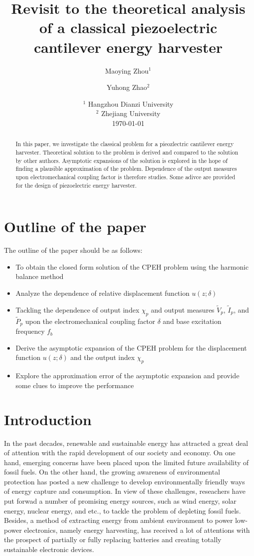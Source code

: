 \documentclass{article}
\title{Revisit to the theoretical analysis of a classical piezoelectric cantilever energy harvester}
\author{Maoying Zhou$^1$ \and Yuhong Zhao$^2$}
\date{%
    $^1$ Hangzhou Dianzi University\\%
    $^2$ Zhejiang University\\[2ex]%
    \today
}
\begin{document}
\maketitle


\begin{abstract}
 In this paper, we investigate the classical problem for a pieozlectric cantilever energy harvester. Theoretical solution to the problem is derived and compared to the solution by other authors. Asymptotic expansions of the solution is explored in the hope of finding a plausible approximation of the problem. Dependence of the output measures upon electromechanical coupling factor is therefore studies. Some adivce are provided for the design of piezoelectric energy harvester.
\end{abstract}

\section{Outline of the paper}
The outline of the paper should be as follows:
\begin{itemize}
    \item To obtain the closed form solution of the CPEH problem using the harmonic balance method
    \item Analyze the dependence of relative displacement function $u(z;\delta)$
    \item Tackling the dependence of output index $\chi_p$ and output measures $\tilde{V}_p$, $\tilde{I}_p$, and $\tilde{P}_p$ upon the electromechanical coupling factor $\delta$ and base excitation frequency $f_b$
    \item Derive the asymptotic expansion of the CPEH problem for the displacement function $u(z;\delta)$ and the output index $\chi_p$
    \item Explore the approximation error of the asymptotic expansion and provide some clues to improve the performance
\end{itemize}

\section{Introduction}


In the past decades, renewable and sustainable energy has attracted a great deal of attention with the rapid development of our society and economy. On one hand, emerging concerns have been placed upon the limited future availability of fossil fuels. On the other hand, the growing awareness of environmental protection has posted a new challenge to develop environmentally friendly ways of energy capture and consumption. In view of these challenges, reseachers have put forwad a number of promising energy sources, such as wind energy, solar energy, nuclear energy, and etc., to tackle the problem of depleting fossil fuels. Besides, a method of extracting energy from ambient environment to power low-power electronics, namely energy harvesting, has received a lot of attentions with the prospect of partially or fully replacing batteries and creating totally sustainable electronic devices.  
\end{document}
